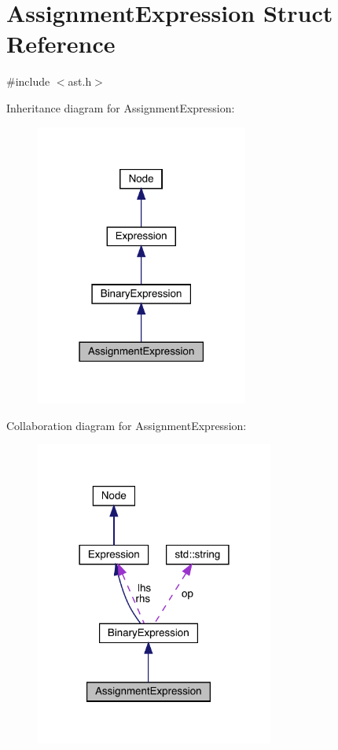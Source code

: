 \hypertarget{struct_assignment_expression}{}\section{Assignment\+Expression Struct Reference}
\label{struct_assignment_expression}


{\ttfamily \#include $<$ast.\+h$>$}



Inheritance diagram for Assignment\+Expression\+:
\nopagebreak
\begin{figure}[H]
\begin{center}
\leavevmode
\includegraphics[width=198pt]{struct_assignment_expression__inherit__graph}
\end{center}
\end{figure}


Collaboration diagram for Assignment\+Expression\+:
\nopagebreak
\begin{figure}[H]
\begin{center}
\leavevmode
\includegraphics[width=222pt]{struct_assignment_expression__coll__graph}
\end{center}
\end{figure}
